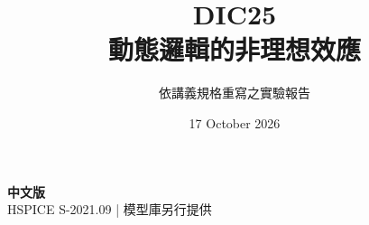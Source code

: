 \documentclass[11pt,a4paper]{article}
\title{\color{accent}DIC25\\[4pt]動態邏輯的非理想效應}
\author{依講義規格重寫之實驗報告}
\date{17 October 2026}
\begin{document}
\maketitle
\begin{center}\small\textbf{中文版}\\
HSPICE S-2021.09 \quad | \quad 模型庫另行提供
\end{center}


\end{document}
